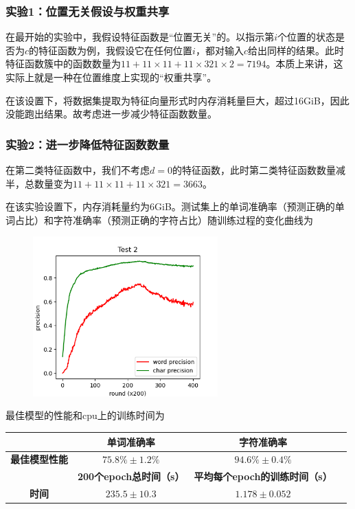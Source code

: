 \documentclass[a4paper,UTF8]{article}
\numberwithin{equation}{section}
\begin{document}
\subsubsection{实验1：位置无关假设与权重共享}
\par 在最开始的实验中，我假设特征函数是“位置无关”的。以指示第$i$个位置的状态是否为$c$的特征函数为例，我假设它在任何位置$i$，都对输入$c$给出同样的结果。此时特征函数簇中的函数数量为$11+11\times 11+11\times 321 \times 2=7194$。本质上来讲，这实际上就是一种在位置维度上实现的“权重共享”。
\par 在该设置下，将数据集提取为特征向量形式时内存消耗量巨大，超过16GiB，因此没能跑出结果。故考虑进一步减少特征函数数量。

\subsubsection{实验2：进一步降低特征函数数量}
\par 在第二类特征函数中，我们不考虑$d=0$的特征函数，此时第二类特征函数数量减半，总数量变为$11+11\times 11+11\times 321=3663$。
\par 在该实验设置下，内存消耗量约为6GiB。测试集上的单词准确率（预测正确的单词占比）和字符准确率（预测正确的字符占比）随训练过程的变化曲线为
\begin{figure}[H]
    \centering
    \includegraphics[width=2.8in]{figs/fig1.png}
\end{figure}

\par 最佳模型的性能和cpu上的训练时间为
\begin{table}[H]
    \centering
    \begin{tabular}{cccc}
        \hline 
         & \textbf{单词准确率} & \textbf{字符准确率} \\ 
        \hline 
        \textbf{最佳模型性能} & $75.8\% \pm 1.2\%$ & $94.6\%\pm 0.4\%$ \\ 
        \hline
        \hline
        &\textbf{200个epoch总时间（s）}&\textbf{平均每个epoch的训练时间（s）}\\
        \hline
        \textbf{时间} &$235.5\pm 10.3$ & $1.178\pm0.052$\\
        \hline
    \end{tabular}
\end{table}
\end{document}
